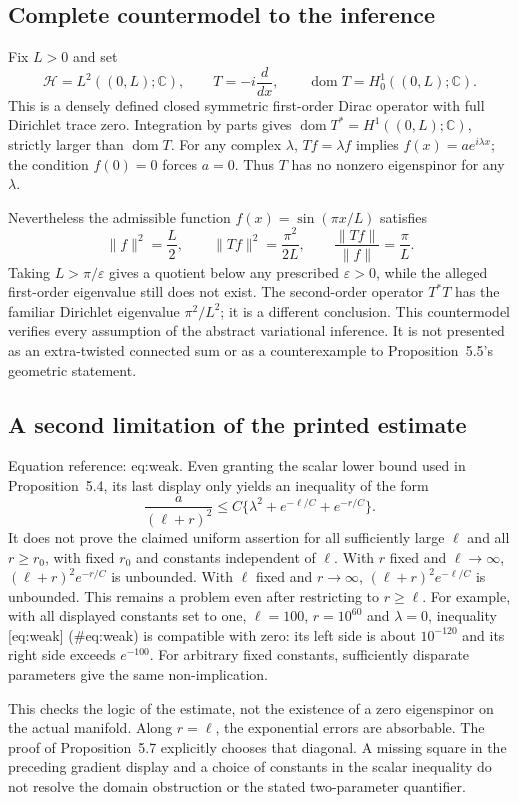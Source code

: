 \documentclass[10pt]{article}
\begin{document}
\subsection*{Complete countermodel to the inference}
Fix \(L>0\) and set \[\mathcal H=L^2((0,L);\mathbb C),\qquad
 T=-i\frac{d}{dx},\qquad \operatorname{dom}T=H^1_0((0,L);\mathbb C).\] This is a densely defined closed symmetric first-order Dirac operator with full Dirichlet trace zero. Integration by parts gives \(\operatorname{dom}T^*=H^1((0,L);\mathbb C)\), strictly larger than \(\operatorname{dom}T\). For any complex \(\lambda\), \(Tf=\lambda f\) implies \(f(x)=a e^{i\lambda x}\); the condition \(f(0)=0\) forces \(a=0\). Thus \(T\) has no nonzero eigenspinor for any \(\lambda\).\par
Nevertheless the admissible function \(f(x)=\sin(\pi x/L)\) satisfies \[\|f\|^2=\frac L2,\qquad
 \|Tf\|^2=\frac{\pi^2}{2L},\qquad
 \frac{\|Tf\|}{\|f\|}=\frac{\pi}{L}.\] Taking \(L>\pi/\varepsilon\) gives a quotient below any prescribed \(\varepsilon>0\), while the alleged first-order eigenvalue still does not exist. The second-order operator \(T^*T\) has the familiar Dirichlet eigenvalue \(\pi^2/L^2\); it is a different conclusion. This countermodel verifies every assumption of the abstract variational inference. It is not presented as an extra-twisted connected sum or as a counterexample to Proposition 5.5’s geometric statement.\par
\subsection*{A second limitation of the printed estimate}
Equation reference: eq:weak. Even granting the scalar lower bound used in Proposition 5.4, its last display only yields an inequality of the form \[
 \frac{a}{(\ell+r)^2}
 \leq C\{\lambda^2+e^{-\ell/C}+e^{-r/C}\}.\] It does not prove the claimed uniform assertion for all sufficiently large \(\ell\) and all \(r\geq r_0\), with fixed \(r_0\) and constants independent of \(\ell\). With \(r\) fixed and \(\ell\to\infty\), \((\ell+r)^2 e^{-r/C}\) is unbounded. With \(\ell\) fixed and \(r\to\infty\), \((\ell+r)^2 e^{-\ell/C}\) is unbounded. This remains a problem even after restricting to \(r\geq\ell\). For example, with all displayed constants set to one, \(\ell=100\), \(r=10^{60}\) and \(\lambda=0\), inequality [eq:weak] (\#eq:weak) is compatible with zero: its left side is about \(10^{-120}\) and its right side exceeds \(e^{-100}\). For arbitrary fixed constants, sufficiently disparate parameters give the same non-implication.\par
This checks the logic of the estimate, not the existence of a zero eigenspinor on the actual manifold. Along \(r=\ell\), the exponential errors are absorbable. The proof of Proposition 5.7 explicitly chooses that diagonal. A missing square in the preceding gradient display and a choice of constants in the scalar inequality do not resolve the domain obstruction or the stated two-parameter quantifier.\par
\end{document}
